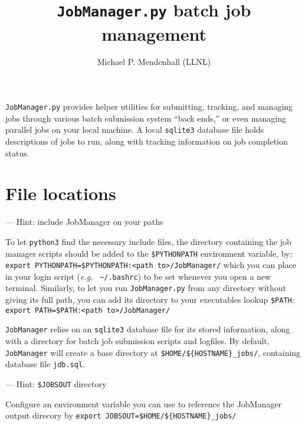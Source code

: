 \documentclass[12pt,english]{article}
\newenvironment{hint}[1][{}]{
\definecolor{shadecolor}{rgb}{.9,.9,.9}
\begin{shaded}
{\color{purple}--- Hint: #1}

}{\end{shaded}}
\newcommand{\cd}[1]{\texorpdfstring{{\color{blue} \texttt{#1}}}{#1}}
\newcommand{\eg}{{\em e.g.}}
\newcommand{\tld}{\textasciitilde}
\begin{document}
\title{\cd{JobManager.py} batch job management}
\author{Michael P. Mendenhall (LLNL)}
\maketitle

\cd{JobManager.py} provides helper utilities for submitting, tracking,
    and managing jobs through various batch submission system ``back ends,''
    or even managing parallel jobs on your local machine.
A local \cd{sqlite3} database file holds descriptions of jobs to run,
    along with tracking information on job completion status.

\tableofcontents

\section{File locations}

\begin{hint}[include JobManager on your paths]
To let \cd{python3} find the necessary include files,
    the directory containing the job manager scripts should be added to
    the \cd{\$PYTHONPATH} environment variable, by: \newline
\cd{export PYTHONPATH=\$PYTHONPATH:<path to>/JobManager/} \newline
which you can place in your login script (\eg\ \cd{\tld/.bashrc}) to be set
    whenever you open a new terminal.
Similarly, to let you run \cd{JobManager.py} from any directory without
    giving its full path, you can add its directory to your executables lookup \cd{\$PATH}: \newline
\cd{export PATH=\$PATH:<path to>/JobManager/}
\end{hint}

\cd{JobManager} relies on an \cd{sqlite3} database file for its stored information,
    along with a directory for batch job submission scripts and logfiles.
By default, \cd{JobManager} will create a base directory at \cd{\$HOME/\$\{HOSTNAME\}\_jobs/},
    containing database file \cd{jdb.sql}.

\begin{hint}[\cd{\$JOBSOUT} directory]
Configure an environment variable you can use to reference the JobManager output direcory by \newline
\cd{export JOBSOUT=\$HOME/\$\{HOSTNAME\}\_jobs/}
\end{hint}
\end{document}
